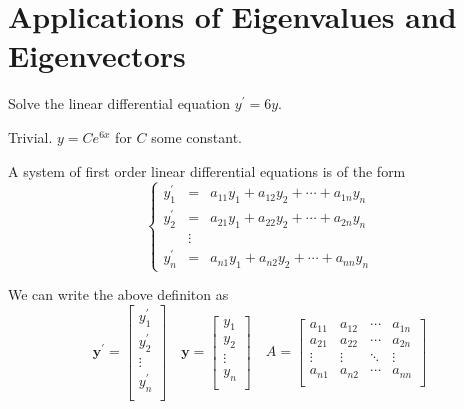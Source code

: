 \section{Applications of Eigenvalues and Eigenvectors}
\begin{exercise}
    Solve the linear differential equation \(y^{\prime} =6y\).
\end{exercise}
\begin{solution}
    Trivial. \(y=Ce^{6x} \) for \(C \) some constant.
\end{solution}
\begin{definition}
    A system of first order linear differential equations is of the form
    \[
        \left\{
            \begin{array}{ccc}
                y_1^{\prime} &=&a_{11}y_1 +a_{12}y_{2}+\cdots+a_{1n}y_n\\
                y_2^{\prime} &=&a_{21}y_1 +a_{22}y_2 +\cdots+a_{2n}y_n\\
                &\vdots&\\
                y_n^{\prime} &=&a_{n1}y_1 +a_{n2}y_2 +\cdots+a_{nn}y_n          
            \end{array}
        \right.
    \]
\end{definition}
We can write the above definiton as
\[
    \mathbf{y} ^{\prime} =\begin{bmatrix}
        y_1^{\prime}   \\
          y_2^{\prime} \\
          \vdots\\
          y_n^{\prime}  \\
    \end{bmatrix}\quad \mathbf{y} =\begin{bmatrix}
         y_1 \\
          y_2\\
          \vdots\\
          y_n\\
    \end{bmatrix}\quad A=\begin{bmatrix}
        a_{11}  &a_{12}   &\cdots  &a_{1n}    \\
         a_{21} &a_{22}   &\cdots  &a_{2n}    \\
         \vdots&\vdots  &\ddots  &\vdots   \\
         a_{n1} &a_{n2}   &\cdots  &a_{nn}    \\
    \end{bmatrix}
\]
